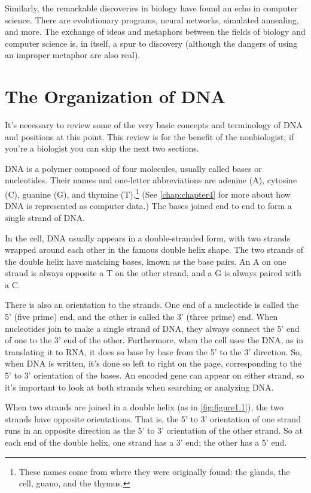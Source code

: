 Similarly, the remarkable discoveries in biology have found an echo in computer science. There are evolutionary programs, neural networks, simulated annealing, and more. The exchange of ideas and metaphors between the fields of biology and computer science is, in itself, a spur to discovery (although the dangers of using an improper metaphor are also real). 

\section{The Organization of DNA}
It's necessary to review some of the very basic concepts and terminology of DNA and positions at this point. This review is for the benefit of the nonbiologist; if you're a biologist you can skip the next two sections.

DNA is a polymer composed of four molecules, usually called bases or nucleotides. Their names and one-letter abbreviations are adenine (A), cytosine (C), guanine (G), and thymine (T).\footnote{These names come from where they were originally found: the glands, the cell, guano, and the thymus.} (See \autoref{chap:chapter4} for more about how DNA is represented as computer data.) The bases joined end to end to form a single strand of DNA.  

In the cell, DNA usually appears in a double-stranded form, with two strands wrapped around each other in the famous double helix shape. The two strands of the double helix have matching bases, known as the base pairs. An A on one strand is always opposite a T on the other strand, and a G is always paired with a C.

There is also an orientation to the strands. One end of a nucleotide is called the 5' (five prime) end, and the other is called the 3' (three prime) end. When nucleotides join to make a single strand of DNA, they always connect the 5' end of one to the 3' end of the other. Furthermore, when the cell uses the DNA, as in translating it to RNA, it does so base by base from the 5' to the 3' direction. So, when DNA is written, it's done so left to right on the page, corresponding to the 5' to 3' orientation of the bases. An encoded gene can appear on either strand, so it's important to look at both strands when searching or analyzing DNA.

When two strands are joined in a double helix (as in \autoref{fig:figure1.1}), the two strands have opposite orientations. That is, the 5' to 3' orientation of one strand runs in an opposite direction as the 5' to 3' orientation of the other strand. So at each end of the double helix, one strand has a 3' end; the other has a 5' end.

